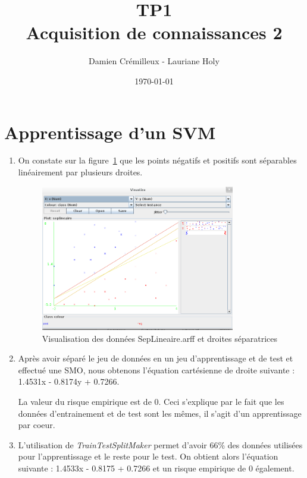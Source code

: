 \documentclass[a4paper]{article}
\title{TP1 \\ Acquisition de connaissances 2}
\author{Damien Crémilleux - Lauriane Holy}
\date{\today}
\begin{document}
\maketitle


\section{Apprentissage d'un SVM}

\begin{enumerate}


\item On constate sur la figure~\ref{fig:capture1} que les points négatifs et positifs sont séparables linéairement par plusieurs droites.
	

\begin{figure}[h]
 	 \begin{center}	
 	   \includegraphics[width=0.8\textwidth]{Capture1.png}
 	   \caption{Visualisation des données SepLineaire.arff et droites séparatrices}
 	   \label{fig:capture1} 
 	 \end{center}
	\end{figure}

\item Après avoir séparé le jeu de données en un jeu d'apprentissage et de test et effectué une SMO, nous obtenons l'équation cartésienne de droite suivante : 1.4531x - 0.8174y + 0.7266.

La valeur du risque empirique est de 0. Ceci s'explique par le fait que les données d'entrainement et de test sont les mêmes, il s'agit d'un apprentissage par coeur.

\item L'utilisation de \textit{TrainTestSplitMaker} permet d'avoir 66\% des données utilisées pour l'apprentissage et le reste pour le test. On obtient alors l'équation suivante : 1.4533x - 0.8175 + 0.7266 et un risque empirique de 0 également.


\end{enumerate}
\end{document}

